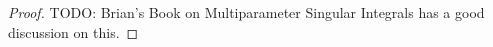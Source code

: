 \begin{proof}
    TODO: Brian's Book on Multiparameter Singular Integrals has a good discussion on this.
\begin{comment}
    For $t < 0$, we make the family of all such kernels above into a Fr\'{e}chet space $X_t$ by taking the optimal implicit constants in the growth condition inequalities above as seminorms. For $t \geq 0$, we make $X_t$ into a locally convex space by taking those implicit constants as seminorms, as well as taking, for each bounded set $\mathcal{B}$, the implicit constants in the cancellation condition as a seminorm. For $t < 0$, the growth conditions on elements of $X_t$ imply we have a continuous inclusion $X_t \to L^\infty_x(\RR^d) L^1_z(\RR^d) \to \mathcal{S}(\RR^d \times \RR^d)^*$. For $t \geq 0$,

    Let $k \in X_t$ be a kernel, and let $a(x,\xi)$ be the Fourier transform of the kernel in the $z$-variable. If we split up $k = k_0 + k_\infty$ and thus write $a = a_0 + a_\infty$, where $k_0$ is supported on $|z| \leq 2$, and $k_\infty$ on $|z| \geq 1$, then we see that, because $k_0$ is compactly supported, $a_0$ is smooth, and because $k_\infty$ is rapidly decaying away from the origin, $a_\infty$ is smooth. Thus $a \in C^\infty(\RR^d \times \RR^d)$ for any $k \in X_t$.

    Now set $k_R(x,z) = k(x,z/R)$ for each $R > 0$. The family
    \[ \{ R^{-t-d} k_R : R > 0 \} \]
    is then a bounded set in $X_t$, since, for instance,
    \[ \sup \{ |z|^{t+d+n_2+N} |\nabla_x^{n_1} \nabla_z^{n_2} k_R(x,z)| \} = R^{t + d + N} \sup \{ |z|^{t + d + n_2 + N} |\nabla_x^{n_1} \nabla_z^{n_2} k(x,z)| \} \]


    Suppose we can prove that $|a(x,\xi)| \leq C(a)$ for all $x \in \RR^d$, and $1/2 \leq |\xi| \leq 2$, where $a \mapsto C(a)$ is a continuous seminorm on $X$. If we set
    \[ a_R(x,\xi) = \int k_R(x,z) e^{-2 \pi i \xi \cdot z}, \]
    then we will then have actually proved that $|a_R(x,\xi)| \leq C(a) R^{t+d}$ for all $R > 0$ and $1/2 \leq |\xi| \leq 2$. Since $a_R(x,\xi) = R^d a(x,R \xi)$, this implies that
    \[ |a(x,\xi)| \lesssim_t C(a) |\xi|^t \]
    for all $\xi$. Since $k \mapsto D^\alpha_x D^\beta_z k$ is a continuous operator on $X_t$ to $X_{t - |\beta|}$, this means we will have actually proved that
    \[ |\nabla^{n_1}_x \nabla^{n_2}_z a(x,\xi)| \lesssim_t C_{n_1,n_2}(a) |\xi|^{t-n_2}. \]
    Thus we have proved that $a \in \mathcal{S}^t(\RR^d \times \RR^d)$. For $t < 0$, to show that the bounds on $1/2 \leq |\xi| \leq 2$ hold, we just note that we can take $C(a) = \| k \|_{L^\infty_x L^1_z}$, which is a continuous seminorm on $X_t$ because
    \[ \int |k(x,z)|\; dz \leq \sup_{x \in \RR^d, |z| \leq 1} |k(x,z)| |z|^{t + d} + \sup_{x \in \RR^d, |z| \geq 1} |k(x,z)| |z|^{d+1}. \]

    TODO: Ask Andreas about this.
\end{comment}
\end{proof}

